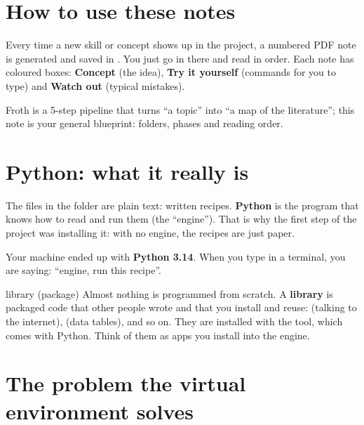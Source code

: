 \documentclass[11pt,a4paper]{article}
\begin{document}
\section{How to use these notes}

Every time a new skill or concept shows up in the project, a numbered PDF note is generated
and saved in . You just go in there and read in order. Each note has
coloured boxes: \textcolor{litblue}{\textbf{Concept}} (the idea),
\textcolor{litgreen}{\textbf{Try it yourself}} (commands for you to type) and
\textcolor{litorange}{\textbf{Watch out}} (typical mistakes).

\begin{resumen}
Froth is a 5-step pipeline that turns ``a topic'' into ``a map of the literature''; this
note is your general blueprint: folders, phases and reading order.
\end{resumen}
\clearpage
{}
{}

\section{Python: what it really is}

The  files in the  folder are plain text: written recipes.
\textbf{Python} is the program that knows how to read and run them (the ``engine''). That is
why the first step of the project was installing it: with no engine, the recipes are just
paper.

Your machine ended up with \textbf{Python 3.14}. When you type  in a
terminal, you are saying: ``engine, run this recipe''.

\begin{concepto}{library (package)}
Almost nothing is programmed from scratch. A \textbf{library} is packaged code that other
people wrote and that you install and reuse:  (talking to the internet),
 (data tables), and so on. They are installed with the  tool,
which comes with Python. Think of them as apps you install into the engine.
\end{concepto}

\section{The problem the virtual environment solves}
\end{document}
